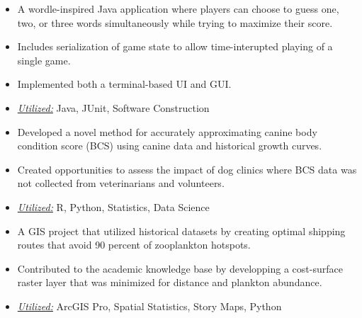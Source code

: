 \documentclass[10pt,a4paper,ragged2e]{altacv}
\begin{document}
\begin{itemize}
  \item A wordle-inspired Java application where players can choose to guess one, two, or three words simultaneously while trying to maximize their score.
  \item Includes serialization of game state to allow time-interupted playing of a single game.
  \item Implemented both a terminal-based UI and GUI.
  \item \underline{\textit{Utilized:}} Java, JUnit, Software Construction
\end{itemize}
\divider\small

\begin{itemize}
  \item Developed a novel method for accurately approximating canine body condition score (BCS) using canine data and historical growth curves.
  \item Created opportunities to assess the impact of dog clinics where BCS data was not collected from veterinarians and volunteers.
  \item \underline{\textit{Utilized:}} R, Python, Statistics, Data Science
\end{itemize}
\divider\small

\begin{itemize}
  \item A GIS project that utilized historical datasets by creating optimal shipping routes that avoid 90 percent of zooplankton hotspots.
  \item Contributed to the academic knowledge base by developping a cost-surface raster layer that was minimized for distance and plankton abundance.
  \item \underline{\textit{Utilized:}} ArcGIS Pro, Spatial Statistics, Story Maps, Python
\end{itemize}
\divider\small
\end{document}
